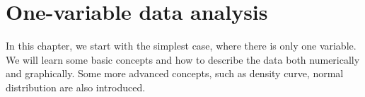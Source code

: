\documentclass[a4paper, 12pt,twoside]{book}
\newenvironment{knitrout}{}{} %
\begin{document}
\pagestyle{fancy}
\fancyhf{}
\renewcommand{\chaptermark}[1]{ \markboth{#1}{} }
\fancyhead[CE,CO]{\leftmark}
\fancyfoot[LE,RO]{\thepage}

\chapter{One-variable data analysis}
\thispagestyle{empty}
In this chapter, we start with the simplest case, where there is only one variable. We will learn some basic concepts and how to describe the data both numerically and graphically. Some more advanced concepts, such as density curve, normal distribution are also introduced.
\newpage

\begin{center}
\begin{knitrout}
\color{fgcolor}


\end{knitrout}
\end{center}
\end{document}
